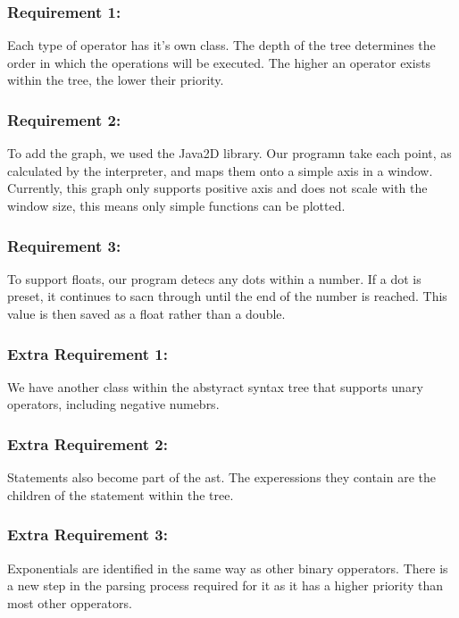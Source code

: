 \documentclass[a4paper, oneside, 11pt]{report}
\begin{document}
\subsubsection{Requirement 1: }

Each type of operator has it's own class. The depth of the tree determines the order in which the operations will be executed. The higher an operator exists within the tree, the lower their priority.

\subsubsection {Requirement 2: }

To add the graph, we used the Java2D library. Our programn take each point, as calculated by the interpreter, and maps them onto a simple axis in a window. Currently, this graph only supports positive axis and does not scale with the window size, this means only simple functions can be plotted.

\subsubsection {Requirement 3: }

To support floats, our program detecs any dots within a number. If a dot is preset, it continues to sacn through until the end of the number is reached. This value is then saved as a float rather than a double.

\subsubsection {Extra Requirement 1: }

We have another class within the abstyract syntax tree that supports unary operators, including negative numebrs.

\subsubsection {Extra Requirement 2: }

Statements also become part of the ast. The experessions they contain are the children of the statement within the tree.

\subsubsection { Extra Requirement 3: }

Exponentials are identified in the same way as other binary opperators. There is a new step in the parsing process required for it as it has a higher priority than most other opperators.
\end{document}
